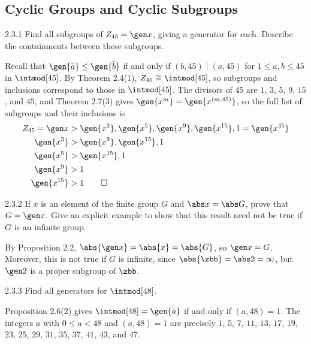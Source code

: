 \subsection{Cyclic Groups and Cyclic Subgroups}

\begin{exercise}{2.3.1}
    Find all subgroups of $Z_{45} = \gen x$, giving a generator for each.
	Describe the containments between these subgroups.
\end{exercise}

\begin{sol}
    Recall that $\gen{\bar a} \leq \gen{\bar b}$ if and only if $(b, 45) \mid (a, 45)$ for $1 \leq a, b \leq 45$ in $\intmod[45]$.
    By Theorem 2.4(1), $Z_{45} \cong \intmod[45]$, so subgroups and inclusions correspond to those in $\intmod[45]$.
    The divisors of $45$ are $1$, $3$, $5$, $9$, $15$, and $45$, and Theorem 2.7(3) gives $\gen{x^m} = \gen{x^{(m, 45)}}$, so the full list of subgroups and their inclusions is
    \begin{align*}
        Z_{45} = \gen x & > \gen{x^3}, \gen{x^5}, \gen {x^9}, \gen{x^{15}}, 1 = \gen{x^{45}} \\
        \gen{x^3} & > \gen{x^9}, \gen{x^{15}}, 1 \\
        \gen{x^5} & > \gen{x^{15}}, 1 \\
        \gen{x^9} & > 1 \\
        \gen{x^{15}} & > 1 \qedhere
    \end{align*}
\end{sol}

\begin{exercise}{2.3.2}
    If $x$ is an element of the finite group $G$ and $\abs x = \abs G$, prove that $G = \gen x$.
	Give an explicit example to show that this result need not be true if $G$ is an infinite group.
\end{exercise}

\begin{sol}
    By Proposition 2.2, $\abs{\gen x} = \abs{x} = \abs{G}$, so $\gen x = G$.
	Moreover, this is not true if $G$ is infinite, since $\abs{\zbb} = \abs 2 = \infty$, but $\gen 2$ is a proper subgroup of $\zbb$.
\end{sol}

\begin{exercise}{2.3.3}
    Find all generators for $\intmod[48]$.
\end{exercise}

\begin{sol}
    Proposition 2.6(2) gives $\intmod[48] = \gen{\bar a}$ if and only if $(a, 48) = 1$.
    The integers $a$ with $0 \leq a < 48$ and $(a, 48) = 1$ are precisely $1$, $5$, $7$, $11$, $13$, $17$, $19$, $23$, $25$, $29$, $31$, $35$, $37$, $41$, $43$, and $47$.
\end{sol}


